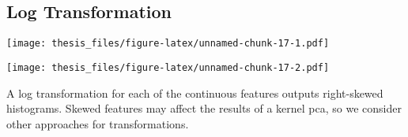 \documentclass[12pt,twoside]{dukestatscithesis}
\theoremstyle{definition}
\theoremstyle{definition}
\theoremstyle{definition}
\theoremstyle{remark}
\begin{document}
\subsection{Log Transformation}\label{log-transformation}
\begin{Shaded}
\begin{Highlighting}[]
\NormalTok{(}\NormalTok{(}\NormalTok{,}\NormalTok{))}
\NormalTok{(}\NormalTok{(}\NormalTok{(}\NormalTok{(}
\end{Highlighting}
\end{Shaded}
\texttt{[image: thesis\_files/figure-latex/unnamed-chunk-17-1.pdf]}
\begin{Shaded}
\begin{Highlighting}[]
\NormalTok{(}\NormalTok{(}
\NormalTok{(}\NormalTok{(}
\end{Highlighting}
\end{Shaded}
\texttt{[image: thesis\_files/figure-latex/unnamed-chunk-17-2.pdf]}

A log transformation for each of the continuous features outputs
right-skewed histograms. Skewed features may affect the results of a
kernel pca, so we consider other approaches for transformations.
\end{document}
